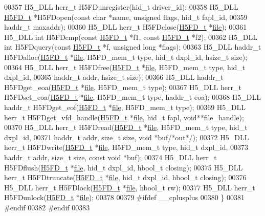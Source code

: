 \begin{DoxyCode}
00357 H5\_DLL herr\_t H5FDunregister(hid\_t driver\_id);
00358 H5\_DLL \hyperlink{struct_h5_f_d__t}{H5FD\_t} *H5FDopen(\textcolor{keyword}{const} \textcolor{keywordtype}{char} *name, \textcolor{keywordtype}{unsigned} flags, hid\_t fapl\_id,
00359                         haddr\_t maxaddr);
00360 H5\_DLL herr\_t H5FDclose(\hyperlink{struct_h5_f_d__t}{H5FD\_t} *\hyperlink{structfile}{file});
00361 H5\_DLL \textcolor{keywordtype}{int} H5FDcmp(\textcolor{keyword}{const} \hyperlink{struct_h5_f_d__t}{H5FD\_t} *f1, \textcolor{keyword}{const} \hyperlink{struct_h5_f_d__t}{H5FD\_t} *f2);
00362 H5\_DLL \textcolor{keywordtype}{int} H5FDquery(\textcolor{keyword}{const} \hyperlink{struct_h5_f_d__t}{H5FD\_t} *f, \textcolor{keywordtype}{unsigned} \textcolor{keywordtype}{long} *flags);
00363 H5\_DLL haddr\_t H5FDalloc(\hyperlink{struct_h5_f_d__t}{H5FD\_t} *\hyperlink{structfile}{file}, H5FD\_mem\_t type, hid\_t dxpl\_id, hsize\_t size);
00364 H5\_DLL herr\_t H5FDfree(\hyperlink{struct_h5_f_d__t}{H5FD\_t} *\hyperlink{structfile}{file}, H5FD\_mem\_t type, hid\_t dxpl\_id,
00365                        haddr\_t addr, hsize\_t size);
00366 H5\_DLL haddr\_t H5FDget\_eoa(\hyperlink{struct_h5_f_d__t}{H5FD\_t} *\hyperlink{structfile}{file}, H5FD\_mem\_t type);
00367 H5\_DLL herr\_t H5FDset\_eoa(\hyperlink{struct_h5_f_d__t}{H5FD\_t} *\hyperlink{structfile}{file}, H5FD\_mem\_t type, haddr\_t eoa);
00368 H5\_DLL haddr\_t H5FDget\_eof(\hyperlink{struct_h5_f_d__t}{H5FD\_t} *\hyperlink{structfile}{file}, H5FD\_mem\_t type);
00369 H5\_DLL herr\_t H5FDget\_vfd\_handle(\hyperlink{struct_h5_f_d__t}{H5FD\_t} *\hyperlink{structfile}{file}, hid\_t fapl, \textcolor{keywordtype}{void}**file\_handle);
00370 H5\_DLL herr\_t H5FDread(\hyperlink{struct_h5_f_d__t}{H5FD\_t} *\hyperlink{structfile}{file}, H5FD\_mem\_t type, hid\_t dxpl\_id,
00371                        haddr\_t addr, \textcolor{keywordtype}{size\_t} size, \textcolor{keywordtype}{void} *buf\textcolor{comment}{/*out*/});
00372 H5\_DLL herr\_t H5FDwrite(\hyperlink{struct_h5_f_d__t}{H5FD\_t} *\hyperlink{structfile}{file}, H5FD\_mem\_t type, hid\_t dxpl\_id,
00373                         haddr\_t addr, \textcolor{keywordtype}{size\_t} size, \textcolor{keyword}{const} \textcolor{keywordtype}{void} *buf);
00374 H5\_DLL herr\_t H5FDflush(\hyperlink{struct_h5_f_d__t}{H5FD\_t} *\hyperlink{structfile}{file}, hid\_t dxpl\_id, hbool\_t closing);
00375 H5\_DLL herr\_t H5FDtruncate(\hyperlink{struct_h5_f_d__t}{H5FD\_t} *\hyperlink{structfile}{file}, hid\_t dxpl\_id, hbool\_t closing);
00376 H5\_DLL herr\_t H5FDlock(\hyperlink{struct_h5_f_d__t}{H5FD\_t} *\hyperlink{structfile}{file}, hbool\_t rw);
00377 H5\_DLL herr\_t H5FDunlock(\hyperlink{struct_h5_f_d__t}{H5FD\_t} *\hyperlink{structfile}{file});
00378 
00379 \textcolor{preprocessor}{#ifdef \_\_cplusplus}
00380 \}
00381 \textcolor{preprocessor}{#endif}
00382 \textcolor{preprocessor}{#endif}
00383 
\end{DoxyCode}
